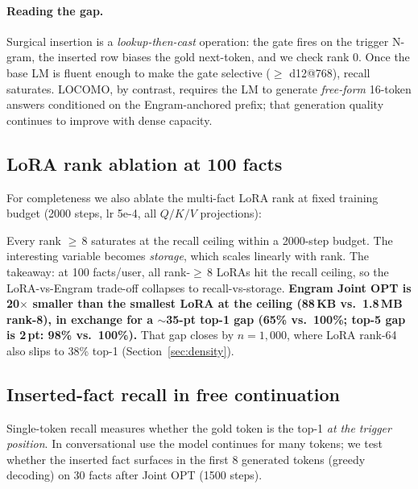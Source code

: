 \documentclass[11pt]{article}
\begin{document}
\paragraph{Reading the gap.} Surgical insertion is a
\emph{lookup-then-cast} operation: the gate fires on the trigger
N-gram, the inserted row biases the gold next-token, and we
check rank 0. Once the base LM is fluent enough to make the gate
selective (${\geq}$ d12@768), recall saturates. LOCOMO, by
contrast, requires the LM to generate \emph{free-form} 16-token
answers conditioned on the Engram-anchored prefix; that
generation quality continues to improve with dense capacity.

\subsection{LoRA rank ablation at 100 facts}
\label{sec:lora-rank}

For completeness we also ablate the multi-fact LoRA rank at fixed
training budget (2000 steps, lr 5e-4, all $Q/K/V$ projections):


Every rank ${\geq}\,8$ saturates at the recall ceiling within a
2000-step budget. The interesting variable becomes
\emph{storage}, which scales linearly with rank. The takeaway:
at 100 facts/user, all rank-${\geq}\,8$ LoRAs hit the recall
ceiling, so the LoRA-vs-Engram trade-off collapses to
recall-vs-storage. \textbf{Engram Joint OPT is 20$\times$
smaller than the smallest LoRA at the ceiling (88\,KB vs.\
1.8\,MB rank-8), in exchange for a $\sim$35-pt top-1 gap
(65\% vs.\ 100\%; top-5 gap is 2\,pt: 98\% vs.\ 100\%).}
That gap closes by $n{=}1{,}000$, where LoRA rank-64 also slips
to 38\% top-1 (Section~\ref{sec:density}).

\subsection{Inserted-fact recall in free continuation}

Single-token recall measures whether the gold token is the
top-1 \emph{at the trigger position}. In conversational use the
model continues for many tokens; we test whether the inserted fact
surfaces in the first 8 generated tokens (greedy decoding) on
30 facts after Joint OPT (1500 steps).

\end{document}
